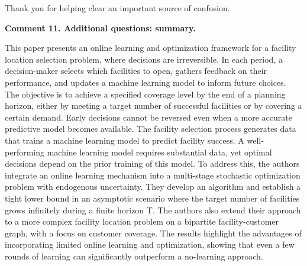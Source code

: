 \documentclass[11pt]{article}
\begin{document}
Thank you for helping clear an important source of confusion.

\begin{commentBox}
    \textbf{Comment 11. Additional questions: summary.}\label{R2:11}

    This paper presents an online learning and optimization framework for a facility location selection problem, where decisions are irreversible. In each period, a decision-maker selects which facilities to open, gathers feedback on their performance, and updates a machine learning model to inform future choices. The objective is to achieve a specified coverage level by the end of a planning horizon, either by meeting a target number of successful facilities or by covering a certain demand. Early decisions cannot be reversed even when a more accurate predictive model becomes available. The facility selection process generates data that trains a machine learning model to predict facility success. A well-performing machine learning model requires substantial data, yet optimal decisions depend on the prior training of this model. To address this, the authors integrate an online learning mechanism into a multi-stage stochastic optimization problem with endogenous uncertainty. They develop an algorithm and establish a tight lower bound in an asymptotic scenario where the target number of facilities grows infinitely during a finite horizon T. The authors also extend their approach to a more complex facility location problem on a bipartite facility-customer graph, with a focus on customer coverage. The results highlight the advantages of incorporating limited online learning and optimization, showing that even a few rounds of learning can significantly outperform a no-learning approach.
\end{commentBox}
\end{document}
